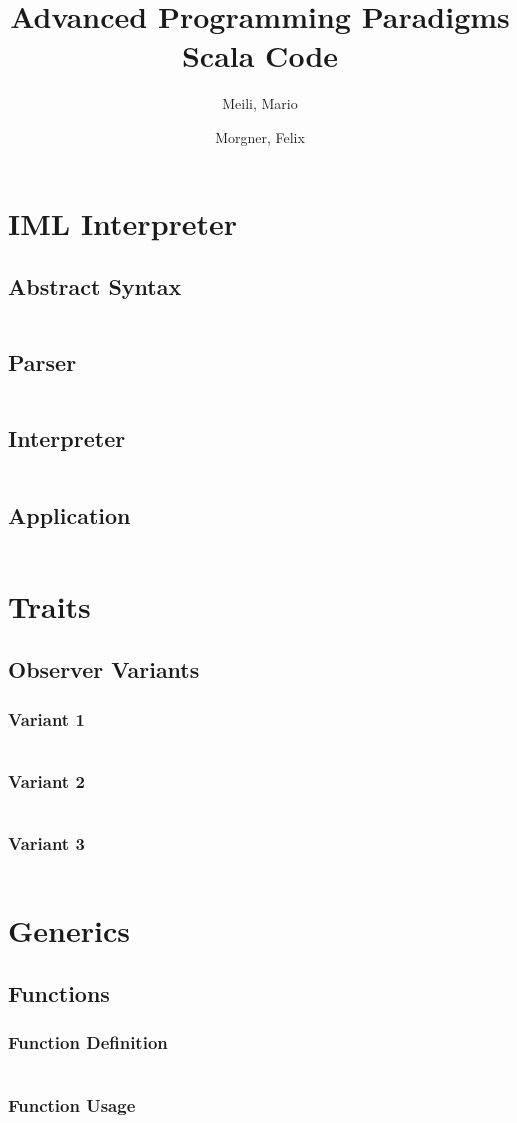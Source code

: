 \documentclass[a4paper,9pt,twoside]{book}
\title{%
Advanced Programming Paradigms\\
\normalsize{Scala Code}
}
\author{%
  Meili, Mario\\
  \and
  Morgner, Felix
}
\newcommand{\scalafile}[1]{\inputminted[breaklines]{scala}{../scala/#1.scala}}
\begin{document}
\maketitle{}
\tableofcontents{}

\chapter{IML Interpreter}
\section{Abstract Syntax}
\scalafile{parser/Syntax}
\section{Parser}
\scalafile{parser/IMLParser}
\section{Interpreter}
\scalafile{parser/Interpreter}
\section{Application}
\scalafile{parser/Test}

\chapter{Traits}
\section{Observer Variants}
\subsection{Variant 1}
\scalafile{traits/ObserverTest1}
\subsection{Variant 2}
\scalafile{traits/ObserverTest2}
\subsection{Variant 3}
\scalafile{traits/ObserverTest3}

\chapter{Generics}
\section{Functions}
\subsection{Function Definition}
\scalafile{generics/Function1}
\subsection{Function Usage}
\scalafile{generics/Main}
\end{document}
